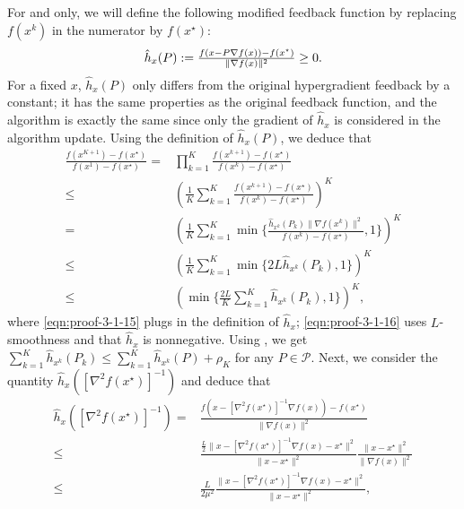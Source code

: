 For  and  only, we will define the following modified feedback function by replacing $f(x^k)$ in the numerator by $f(x^\star)$:
\[ \hat{h}_x (P) := \tfrac{f (x - P \nabla f (x)) - f (x^{\star}) }{\|
   \nabla f (x) \|^2}\geq 0. \]
For a fixed $x$, $\hat{h}_x (P)$ only differs from the original hypergradient
feedback by a constant; it has the same properties as the original feedback function, and the algorithm is exactly the same since only the gradient of $\hat{h}_x$ is considered in the algorithm update.  Using the definition of $\hat{h}_x (P)$, we deduce that 
\begin{align}
  \tfrac{f (x^{K + 1}) - f (x^{\star})}{f (x^1) - f (x^{\star})} ={} & \textstyle \prod_{k = 1}^K \tfrac{f (x^{k + 1}) - f
  (x^{\star})}{f (x^k) - f (x^{\star})} \nonumber\\
  \leq{} & ( \tfrac{1}{K} \textstyle \sum_{k = 1}^K \tfrac{f (x^{k + 1}) - f
  (x^{\star})}{f (x^k) - f (x^{\star})} )^K \nonumber\\
  ={} & ( \tfrac{1}{K} \textstyle \sum_{k = 1}^K \min \{ \tfrac{\hat{h}_{x^k} (P_k) \|
  \nabla f (x^k) \|^2}{f (x^k) - f (x^{\star})}, 1 \} )^K
  \label{eqn:proof-3-1-15} \\
  \leq{} & ( \tfrac{1}{K} \textstyle \sum_{k = 1}^K \min \{ 2 L \hat{h}_{x^k} (P_k), 1 \}
  )^K \label{eqn:proof-3-1-16}\\
  \leq{} & ( \min \{ \tfrac{2 L}{K} \textstyle \sum_{k = 1}^K \hat{h}_{x^k} (P_k), 1
  \} )^K, \nonumber
\end{align}
where \eqref{eqn:proof-3-1-15} plugs in the definition of $\hat{h}_x$; \eqref{eqn:proof-3-1-16} uses $L$-smoothness and that $\hat{h}_x$ is nonnegative. Using , we get  $\textstyle \sum_{k = 1}^K \hat{h}_{x^k} (P_k) \leq \textstyle \sum_{k = 1}^K \hat{h}_{x^k} (P) + \rho_K$
for any $P \in \mathcal{P}$. Next, we consider the quantity $\hat{h}_x ([\nabla^2 f (x^{\star})]^{- 1})$ and deduce that
\begin{align}
  \hat{h}_x ([\nabla^2 f (x^{\star})]^{- 1}) ={} & \tfrac{f (x - [\nabla^2 f
  (x^{\star})]^{- 1} \nabla f (x)) - f (x^{\star})}{\| \nabla f (x) \|^2}
  \nonumber\\
  \leq{} & \tfrac{\frac{L}{2} \| x - [\nabla^2 f (x^{\star})]^{- 1} \nabla f
  (x) - x^{\star} \|^2}{\| x - x^{\star} \|^2} \tfrac{\| x - x^{\star}
  \|^2}{\| \nabla f (x) \|^2} \label{eqn:proof-3-1-17} \\
  \leq{} & \tfrac{L}{2 \mu^2} \tfrac{\| x - [\nabla^2 f (x^{\star})]^{- 1}
  \nabla f (x) - x^{\star} \|^2}{\| x - x^{\star} \|^2}, \label{eqn:proof-3-1-18}
\end{align}
